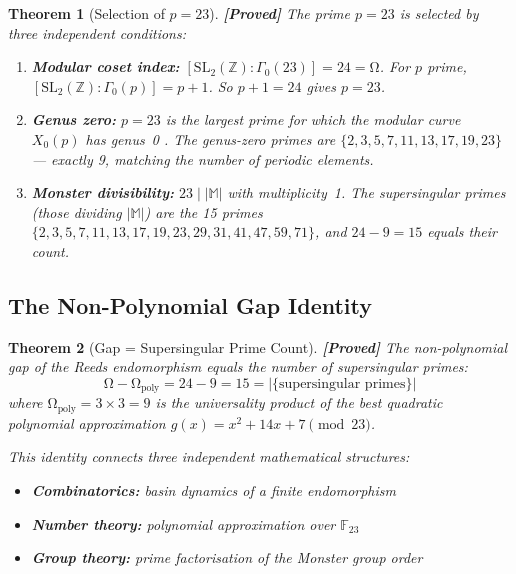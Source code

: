 \documentclass[12pt,a4paper]{article}
\newcommand{\proved}[1]{\textcolor{proved}{\textbf{[Proved]}} #1}
\newtheorem{theorem}{Theorem}[section]\newtheorem{proposition}[theorem]{Proposition}
\theoremstyle{definition}\newtheorem{definition}[theorem]{Definition}
\theoremstyle{remark}\newtheorem{remark}[theorem]{Remark}
\renewcommand{\O}{\mathrm{\Omega}}
\newcommand{\Monster}{\mathbb{M}}\newcommand{\Leech}{\Lambda_{24}}
\begin{document}
\begin{theorem}[Selection of $p = 23$]
\label{thm:p23}
\proved{The prime $p = 23$ is selected by three independent conditions:}
\begin{enumerate}
  \item \textbf{Modular coset index:}
  $[\mathrm{SL}_2(\mathbb{Z}) : \Gamma_0(23)] = 24 = \O$.
  For $p$ prime, $[\mathrm{SL}_2(\mathbb{Z}) : \Gamma_0(p)] = p + 1$.
  So $p + 1 = 24$ gives $p = 23$.

  \item \textbf{Genus zero:} $p = 23$ is the largest prime for which the
  modular curve $X_0(p)$ has genus~0 \cite{ogg1975}. The genus-zero primes
  are $\{2, 3, 5, 7, 11, 13, 17, 19, 23\}$ --- exactly 9, matching the
  number of periodic elements.

  \item \textbf{Monster divisibility:} $23 \mid |\Monster|$ with multiplicity~1.
  The supersingular primes (those dividing $|\Monster|$) are the 15 primes
  $\{2, 3, 5, 7, 11, 13, 17, 19, 23, 29, 31, 41, 47, 59, 71\}$, and
  $24 - 9 = 15$ equals their count.
\end{enumerate}
\end{theorem}

\subsection{The Non-Polynomial Gap Identity}

\begin{theorem}[Gap = Supersingular Prime Count]
\label{thm:gap}
\proved{The non-polynomial gap of the Reeds endomorphism equals the number of
supersingular primes:}
\begin{equation}
  \O - \O_{\mathrm{poly}} = 24 - 9 = 15 = |\{\text{supersingular primes}\}|
\end{equation}
where $\O_{\mathrm{poly}} = 3 \times 3 = 9$ is the universality product of the
best quadratic polynomial approximation $g(x) = x^2 + 14x + 7 \pmod{23}$.

This identity connects three independent mathematical structures:
\begin{itemize}
  \item \textbf{Combinatorics:} basin dynamics of a finite endomorphism
  \item \textbf{Number theory:} polynomial approximation over $\mathbb{F}_{23}$
  \item \textbf{Group theory:} prime factorisation of the Monster group order
\end{itemize}
\end{theorem}
\end{document}
